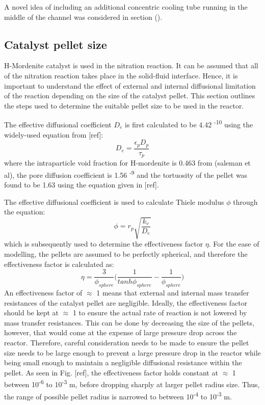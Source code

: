 A novel idea of including an additional concentric cooling tube running in the middle of the channel was considered in section (). %



\subsection{Catalyst pellet size}
H-Mordenite catalyst is used in the nitration reaction. 
It can be assumed that all of the nitration reaction takes place in the solid-fluid interface. Hence, it is important to understand the effect of external and internal diffusional limitation of the reaction depending on the size of the catalyst pellet. This section outlines the steps used to determine the suitable pellet size to be used in the reactor.

The effective diffusional coefficient $D_e$ is first calculated to be 4.42 \textsuperscript{-10} using the widely-used equation from [ref]: 
\begin{equation}
    D_e = \frac{\epsilon_p D_p}{\tau_p}
\end{equation}
where the intraparticle void fraction for H-mordenite is 0.463 from (saleman et al), the pore diffusion coefficient is 1.56 \textsuperscript{-9} and the tortuosity of the pellet was found to be 1.63 using the equation given in [ref]. 

The effective diffusional coefficient is used to calculate Thiele modulus $\phi$ through the equation:
\begin{equation}
    \phi = r_p \sqrt{\frac{k_v}{D_e}}
\end{equation}
which is subsequently used to determine the effectiveness factor $\eta$. For the ease of modelling, the pellets are assumed to be perfectly spherical, and therefore the effectiveness factor is calculated as: 
\begin{equation}
    \eta = \frac{3}{\phi_{sphere}} \bigg(\frac{1}{tanh \phi_{sphere}} - \frac{1}{\phi_{sphere}}\bigg)
\end{equation}
An effectiveness factor of $\approx$ 1 means that external and internal mass transfer resistances of the catalyst pellet are negligible. Ideally, the effectiveness factor should be kept at $\approx$ 1 to ensure the actual rate of reaction is not lowered by mass transfer resistances. This can be done by decreasing the size of the pellets, however, that would come at the expense of large pressure drop across the reactor. Therefore, careful consideration needs to be made to ensure the pellet size needs to be large enough to prevent a large pressure drop in the reactor while being small enough to maintain a negligible diffusional resistance within the pellet. As seen in Fig. [ref], the effectiveness factor holds constant at $\approx$ 1 between 10\textsuperscript{-6} to 10\textsuperscript{-3} m, before dropping sharply at larger pellet radius size. Thus, the range of possible pellet radius is narrowed to between 10\textsuperscript{-4} to 10\textsuperscript{-3} m. 

